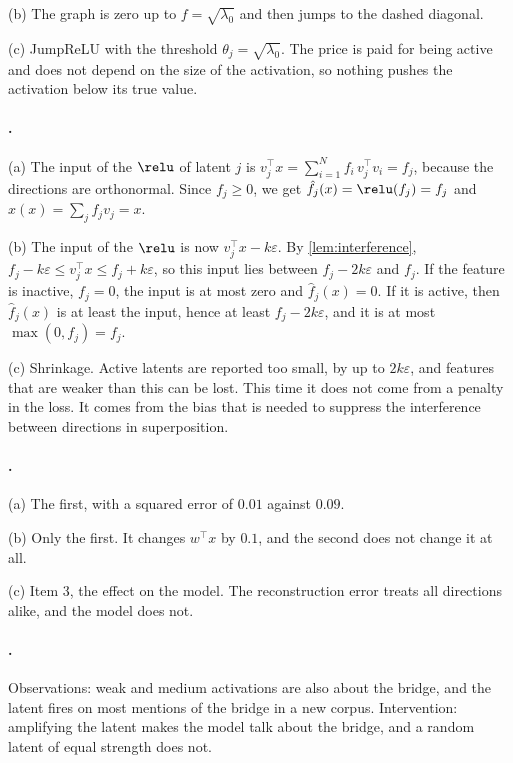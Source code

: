 {(b) The graph is zero up to $f=\sqrt{\lambda_0}$ and then jumps to the dashed diagonal.

(c) JumpReLU with the threshold $\theta_j=\sqrt{\lambda_0}$. The price is paid for being active and does not depend on
the size of the activation, so nothing pushes the activation below its true value.

\paragraph{.}
(a) The input of the $\relu$ of latent $j$ is $v_j^\top x=\sum_{i=1}^{N}f_i\,v_j^\top v_i=f_j$, because the
directions are orthonormal. Since $f_j\ge0$, we get $\hat f_j(x)=\relu(f_j)=f_j$ and
$\hat x(x)=\sum_jf_jv_j=x$.

(b) The input of the $\relu$ is now $v_j^\top x-k\varepsilon$. By \cref{lem:interference},
$f_j-k\varepsilon\le v_j^\top x\le f_j+k\varepsilon$, so this input lies between $f_j-2k\varepsilon$ and $f_j$. If
the feature is inactive, $f_j=0$, the input is at most zero and $\hat f_j(x)=0$. If it is active, then
$\hat f_j(x)$ is at least the input, hence at least $f_j-2k\varepsilon$, and it is at most $\max(0,f_j)=f_j$.

(c) Shrinkage. Active latents are reported too small, by up to $2k\varepsilon$, and features that are weaker than
this can be lost. This time it does not come from a penalty in the loss. It comes from the bias that is needed to
suppress the interference between directions in superposition.

\paragraph{.}
(a) The first, with a squared error of $0.01$ against $0.09$.

(b) Only the first. It changes $w^\top x$ by $0.1$, and the second does not change it at all.

(c) Item 3, the effect on the model. The reconstruction error treats all directions alike, and the model does not.

\paragraph{.}
Observations: weak and medium activations are also about the bridge, and the latent fires on most mentions of the
bridge in a new corpus. Intervention: amplifying the latent makes the model talk about the bridge, and a random
latent of equal strength does not.

}
